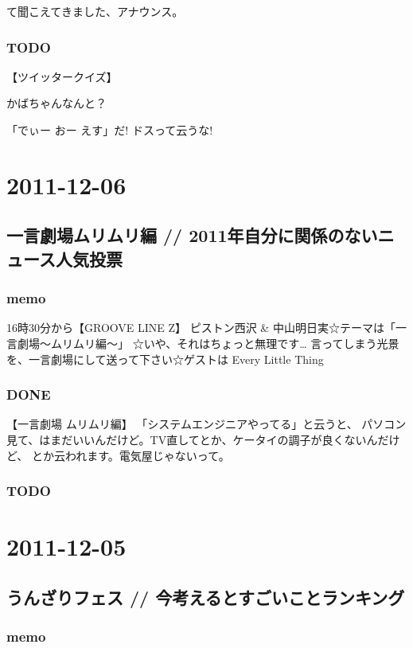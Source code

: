\documentclass[11pt]{article}
\begin{document}
て聞こえてきました、アナウンス。
\subsubsection{\textbf{TODO}}
\label{sec-25_1_3}

【ツイッタークイズ】

かばちゃんなんと？

「でぃー おー えす」だ! ドスって云うな!
\section{2011-12-06}
\label{sec-26}
\subsection{一言劇場ムリムリ編 // 2011年自分に関係のないニュース人気投票}
\label{sec-26_1}
\subsubsection{memo}
\label{sec-26_1_1}

16時30分から【GROOVE LINE Z】
ピストン西沢 \& 中山明日実☆テーマは「一言劇場〜ムリムリ編〜」 ☆いや、それはちょっと無理です… 言ってしまう光景を、一言劇場にして送って下さい☆ゲストは Every Little Thing
\subsubsection{\textbf{DONE}}
\label{sec-26_1_2}

【一言劇場 ムリムリ編】
「システムエンジニアやってる」と云うと、
パソコン見て、はまだいいんだけど。TV直してとか、ケータイの調子が良くないんだけど、
とか云われます。電気屋じゃないって。
\subsubsection{\textbf{TODO}}
\label{sec-26_1_3}
\section{2011-12-05}
\label{sec-27}
\subsection{うんざりフェス // 今考えるとすごいことランキング}
\label{sec-27_1}
\subsubsection{memo}
\label{sec-27_1_1}
\end{document}
